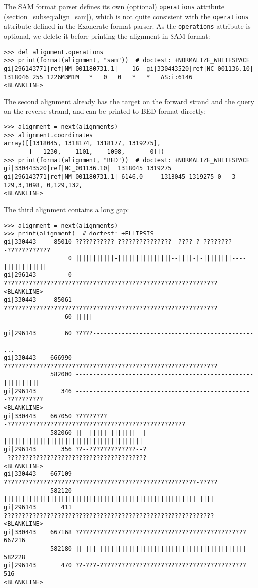 The SAM format parser defines its own (optional) \verb|operations| attribute (section~\ref{subseq:align_sam}), which is not quite consistent with the \verb|operations| attribute defined in the Exonerate format parser. As the \verb|operations| attribute is optional, we delete it before printing the alignment in SAM format:
\begin{verbatim}
>>> del alignment.operations
>>> print(format(alignment, "sam"))  # doctest: +NORMALIZE_WHITESPACE
gi|296143771|ref|NM_001180731.1|	16	gi|330443520|ref|NC_001136.10|	1318046	255	1226M3M1M	*	0	0	*	*	AS:i:6146
<BLANKLINE>
\end{verbatim}

The second alignment already has the target on the forward strand and the query on the reverse strand, and can be printed to BED format directly:
\begin{verbatim}
>>> alignment = next(alignments)
>>> alignment.coordinates
array([[1318045, 1318174, 1318177, 1319275],
       [   1230,    1101,    1098,       0]])
>>> print(format(alignment, "BED"))  # doctest: +NORMALIZE_WHITESPACE
gi|330443520|ref|NC_001136.10|	1318045	1319275	gi|296143771|ref|NM_001180731.1| 6146.0	-	1318045	1319275	0	3	129,3,1098,	0,129,132,
<BLANKLINE>
\end{verbatim}
The third alignment contains a long gap:
\begin{verbatim}
>>> alignment = next(alignments)
>>> print(alignment)  # doctest: +ELLIPSIS
gi|330443     85010 ???????????-???????????????--????-?-????????----????????????
                  0 |||||||||||-|||||||||||||||--||||-|-||||||||----||||||||||||
gi|296143         0 ????????????????????????????????????????????????????????????
<BLANKLINE>
gi|330443     85061 ????????????????????????????????????????????????????????????
                 60 |||||-------------------------------------------------------
gi|296143        60 ?????-------------------------------------------------------
...
gi|330443    666990 ????????????????????????????????????????????????????????????
             582000 --------------------------------------------------||||||||||
gi|296143       346 --------------------------------------------------??????????
<BLANKLINE>
gi|330443    667050 ?????????-??????????????????????????????????????????????????
             582060 ||--|||||-|||||||--|-|||||||||||||||||||||||||||||||||||||||
gi|296143       356 ??--?????????????--?-???????????????????????????????????????
<BLANKLINE>
gi|330443    667109 ??????????????????????????????????????????????????????-?????
             582120 ||||||||||||||||||||||||||||||||||||||||||||||||||||||-||||-
gi|296143       411 ???????????????????????????????????????????????????????????-
<BLANKLINE>
gi|330443    667168 ???????????????????????????????????????????????? 667216
             582180 ||-|||-||||||||||||||||||||||||||||||||||||||||| 582228
gi|296143       470 ??-???-?????????????????????????????????????????    516
<BLANKLINE>
\end{verbatim}

